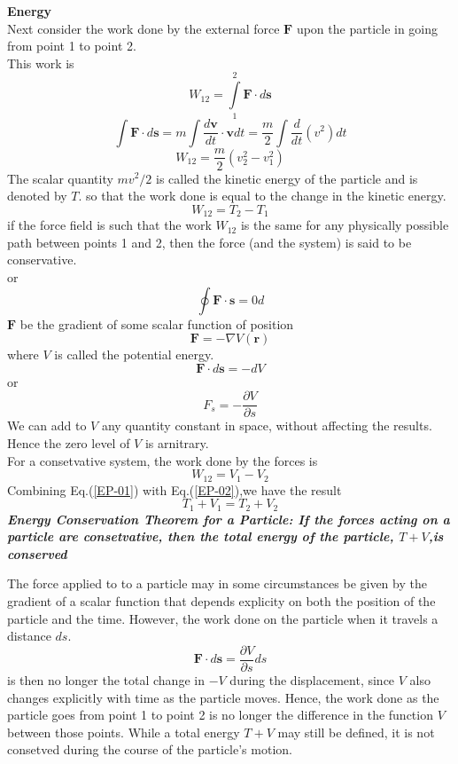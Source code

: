 \textbf{Energy}\\
Next consider the work done by the external force $\textbf{F}$ upon the particle in going from point 1 to point 2. \\
This work is 
$$W_{12}=\int\limits_{1}^{2}\textbf{F}\cdot d\textbf{s}$$
$$\int\textbf{F}\cdot d\textbf{s}=m\int\frac{d\textbf{v}}{dt}\cdot\textbf{v}dt=\frac{m}{2}\int\frac{d}{dt}(v^2)dt$$
$$W_{12}=\frac{m}{2}(v_2^2-v_1^2)$$
The scalar quantity $mv^2/2$ is called the kinetic energy of the particle and is denoted by $T$. so that the work done is equal to the change in the kinetic energy.
\begin{equation}
W_{12} =T_2-T_1\label{EP-01}
\end{equation}
if the force field is such that the work $W_{12}$ is the same for any physically possible path between points 1 and 2, then the force (and the system) is said to be conservative.\\
or
$$\oint\textbf{F}\cdot\textbf{s}=0 d$$
$\textbf{F}$ be the gradient of some scalar function of position
$$\textbf{F}=-\nabla V(\textbf{r})$$
where $V$ is called the potential energy.
$$\textbf{F}\cdot d\textbf{s}=-dV$$
or
$$F_s=-\frac{\partial V}{\partial s}$$
We can add to $V$ any quantity constant in space, without affecting  the results. Hence the zero level of $V$ is arnitrary.\\
For a consetvative system, the work done by the forces is 
\begin{equation}
W_{12}=V_1-V_2\label{EP-02}
\end{equation}
Combining Eq.(\ref{EP-01}) with Eq.(\ref{EP-02}),we have the result 
$$T_1+V_1=T_2+V_2$$
\textbf{\textit{Energy Conservation Theorem for a Particle: If the forces acting on a particle are consetvative, then the total energy of the particle, $T+V$,is conserved}}\\
\begin{note}
	The force applied to to a particle may in some circumstances be given by the gradient of a scalar function that depends explicity on both the position of the particle and the time. However, the work done on the particle when it travels a distance $ds$.
	$$\textbf{F}\cdot{d\textbf{s}=\frac{\partial V}{\partial s}ds}$$
	is then no longer the total change in $-V$ during the displacement, since $V$ also changes explicitly with time as the particle moves. Hence, the work done as the particle goes from point 1 to point 2 is no longer the difference in the function $V$ between those points. While a total  energy $T+V$ may still be defined, it is not consetved during the course of the particle's motion.
\end{note}
